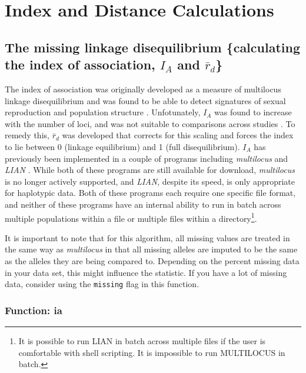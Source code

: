 \documentclass[letterpaper]{article}
\newcommand{\tab}{\hspace*{1em}}
\begin{document}
\section{Index and Distance Calculations}\label{index}
\subsection{The missing linkage disequilibrium \{calculating the index of association, $I_A$ and $\bar r_d$\}}\label{index:iard}

\tab\tab The index of association was originally developed as a measure of multilocus linkage disequilibrium \cite{Brown:1980} and was found to be able to detect signatures of sexual reproduction and population structure \cite{Brown:1980, Smith:1993}. Unfotunately, $I_A$ was found to increase with the number of loci, and was not suitable to comparisons across studies \cite{Agapow:2001}. To remedy this, $\bar{r}_d$ was developed that corrects for this scaling and forces the index to lie between 0 (linkage equilibrium) and 1 (full disequilibrium). $I_A$ has previously been implemented in a couple of programs including \textit{multilocus} \cite{Agapow:2001} and \textit{LIAN} \cite{Haubold:2000}. While both of these programs are still available for download, \textit{multilocus}
is no longer actively supported, and \textit{LIAN}, despite its speed, is only
appropriate for haplotypic data. Both of these programs each require one
specific file format, and neither of these programs have an internal
ability to run in batch across multiple populations within a file or
multiple files within a directory\footnote{It is possible to run LIAN in batch 
across multiple files if the user is comfortable with shell scripting. It is 
impossible to run MULTILOCUS in batch.}.

It is important to note that for this algorithm, all missing values are treated in the same way as \textit{multilocus} in that all missing alleles are imputed to be the same as the alleles they are being compared to. Depending on the percent missing data in your data set, this might influence the statistic. If you have a lot of missing data, consider using the \texttt{missing} flag in this function.
\subsubsection{Function: ia}\label{index:iard:ia}
\end{document}
